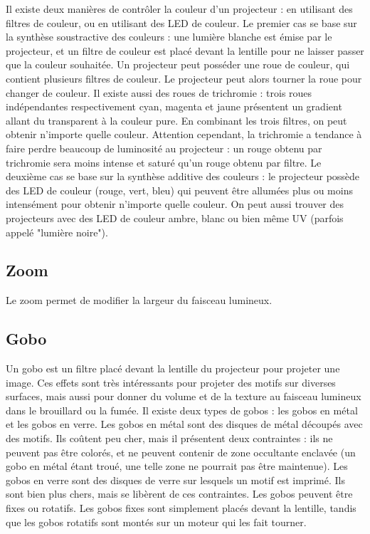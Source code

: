 Il existe deux manières de contrôler la couleur d'un projecteur : en utilisant des filtres de couleur, ou en utilisant des LED de couleur.
\newline
Le premier cas se base sur la synthèse soustractive des couleurs : une lumière blanche est émise par le projecteur, et un filtre de couleur est placé devant la lentille pour ne laisser passer que la couleur souhaitée.
Un projecteur peut posséder une roue de couleur, qui contient plusieurs filtres de couleur. Le projecteur peut alors tourner la roue pour changer de couleur.
Il existe aussi des roues de trichromie : trois roues indépendantes respectivement cyan, magenta et jaune présentent un gradient allant du transparent à la couleur pure. En combinant les trois filtres, on peut obtenir n'importe quelle couleur.
Attention cependant, la trichromie a tendance à faire perdre beaucoup de luminosité au projecteur : un rouge obtenu par trichromie sera moins intense et saturé qu'un rouge obtenu par filtre.
\newline
Le deuxième cas se base sur la synthèse additive des couleurs : le projecteur possède des LED de couleur (rouge, vert, bleu) qui peuvent être allumées plus ou moins intensément pour obtenir n'importe quelle couleur.
On peut aussi trouver des projecteurs avec des LED de couleur ambre, blanc ou bien même UV (parfois appelé "lumière noire").

\subsection{Zoom}
\label{subsec:param_zoom}

Le zoom permet de modifier la largeur du faisceau lumineux.

\subsection{Gobo}
\label{subsec:param_gobo}

Un gobo est un filtre placé devant la lentille du projecteur pour projeter une image. Ces effets sont très intéressants pour projeter des motifs sur diverses surfaces, mais aussi pour donner du volume et de la texture au faisceau lumineux dans le brouillard ou la fumée.
Il existe deux types de gobos : les gobos en métal et les gobos en verre.
\newline
Les gobos en métal sont des disques de métal découpés avec des motifs. Ils coûtent peu cher, mais il présentent deux contraintes : ils ne peuvent pas être colorés, et ne peuvent contenir de zone occultante enclavée (un gobo en métal étant troué, une telle zone ne pourrait pas être maintenue).
\newline
Les gobos en verre sont des disques de verre sur lesquels un motif est imprimé. Ils sont bien plus chers, mais se libèrent de ces contraintes.
\newline
\newline
Les gobos peuvent être fixes ou rotatifs. Les gobos fixes sont simplement placés devant la lentille, tandis que les gobos rotatifs sont montés sur un moteur qui les fait tourner.

